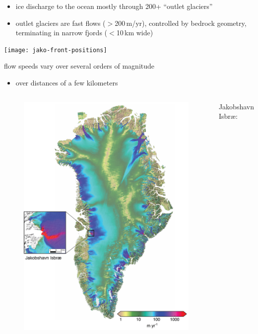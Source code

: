 \documentclass[hide notes,intlimits]{beamer}
\begin{document}
\begin{frame}[plain]
    \begin{itemize}
    \item ice discharge to the ocean mostly through 200+ ``outlet glaciers''
    \item outlet glaciers are fast flows ($>$200\,m/yr), controlled by bedrock geometry, terminating in narrow fjords ($<$10\,km wide)
    \end{itemize}
    \begin{center}
      \texttt{[image: jako-front-positions]}
    \end{center}
\end{frame}
 

\begin{frame}[plain]

\phantom{foo}

flow speeds vary over several orders of magnitude

\begin{itemize}
\item over distances of a few kilometers
\end{itemize}

\vspace{-5mm}
  \begin{columns}
    \column[c]{5.5cm}
    \begin{figure}
      \includegraphics[width=\textwidth]{greenland-obs-overview}
    \end{figure}
    \column[c]{6cm}
    Jakobshavn Isbr{\ae}:
    

\end{columns}
\end{frame}
\end{document}
